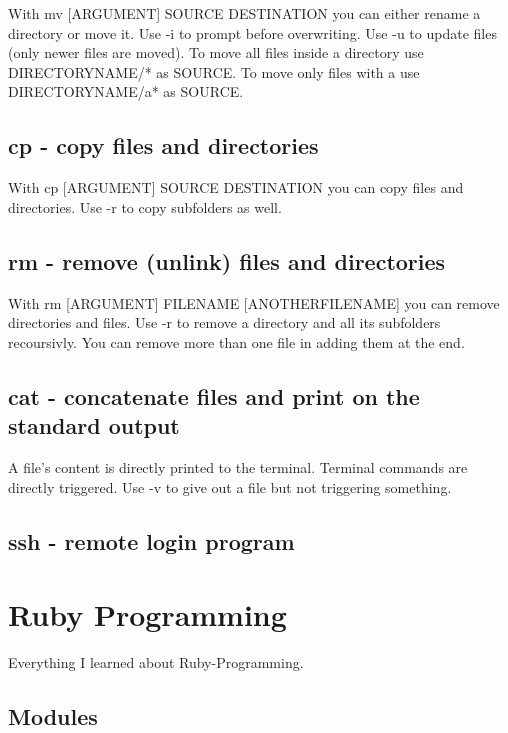\documentclass[10pt,a4paper]{scrartcl}
\begin{document}
With mv [ARGUMENT] SOURCE DESTINATION you can either rename a directory or move it. Use -i to prompt before overwriting. Use -u to update files (only newer files are moved). To move all files inside a directory use DIRECTORYNAME/* as SOURCE. To move only files with a use DIRECTORYNAME/a* as SOURCE.

\subsection{cp - copy files and directories}

With cp [ARGUMENT] SOURCE DESTINATION you can copy files and directories. Use -r to copy subfolders as well.

\subsection{rm - remove (unlink) files and directories}

With rm [ARGUMENT] FILENAME [ANOTHERFILENAME] you can remove directories and files. Use -r to remove a directory and all its subfolders recoursivly. You can remove more than one file in adding them at the end.

\subsection{cat - concatenate files and print on the standard output}

A file's content is directly printed to the terminal. Terminal commands are directly triggered. Use -v to give out a file but not triggering something.

\subsection{ssh - remote login program}

\subsection{}

\section{Ruby Programming}

Everything I learned about Ruby-Programming.

\subsection{Modules}
\end{document}
